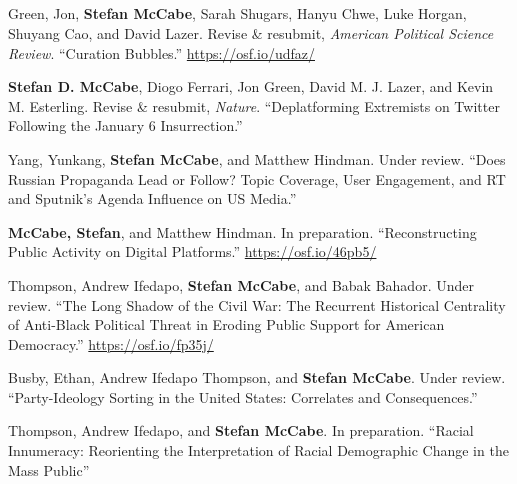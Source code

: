 \documentclass[11pt, letter]{article}
\begin{document}
\subsection*{} %
\vspace{-6mm} %
\begin{hangparas}{.25in}{1}

Green, Jon,\textsuperscript{\textdagger} \textbf{Stefan McCabe},\textsuperscript{\textdagger} Sarah Shugars, Hanyu Chwe, Luke Horgan, Shuyang Cao, and David Lazer. Revise \& resubmit, \textit{American Political Science Review}. ``Curation Bubbles.'' \href{https://osf.io/udfaz/}{https://osf.io/udfaz/} \vspace{2mm}

\textbf{Stefan D. McCabe},\textsuperscript{\textdagger} Diogo Ferrari,\textsuperscript{\textdagger} Jon Green, David M. J. Lazer, and Kevin M. Esterling. Revise \& resubmit, \textit{Nature}. ``Deplatforming Extremists on Twitter Following the January 6 Insurrection.''\vspace{2mm}

Yang, Yunkang, \textbf{Stefan McCabe}, and Matthew Hindman. Under review. ``Does Russian Propaganda Lead or Follow? Topic Coverage, User Engagement, and RT and Sputnik’s Agenda Influence on US Media.'' \vspace{2mm}

\textbf{McCabe, Stefan}, and Matthew Hindman. In preparation. ``Reconstructing Public Activity on Digital Platforms.'' \href{https://osf.io/46pb5/}{https://osf.io/46pb5/} \vspace{2mm}

Thompson, Andrew Ifedapo, \textbf{Stefan McCabe}, and Babak Bahador. Under review. ``The Long Shadow of the Civil War: The Recurrent Historical Centrality of Anti-Black Political Threat in Eroding Public Support for American Democracy.'' \href{https://osf.io/fp35j/}{https://osf.io/fp35j/} \vspace{2mm}

Busby, Ethan, Andrew Ifedapo Thompson, and \textbf{Stefan McCabe}. Under review. ``Party-Ideology Sorting in the United States: Correlates and Consequences.'' \vspace{2mm}

Thompson, Andrew Ifedapo, and \textbf{Stefan McCabe}. In preparation. ``Racial Innumeracy: Reorienting the Interpretation of Racial Demographic Change in the Mass Public''  \vspace{2mm}


\end{hangparas}
\end{document}
